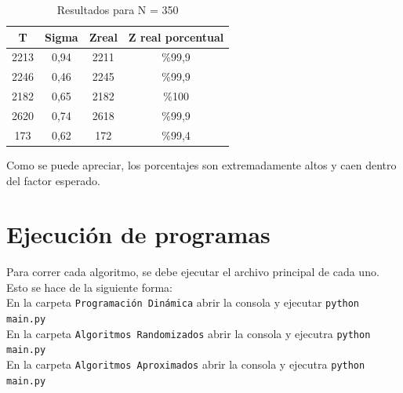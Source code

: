 \documentclass[a4paper, 10pt]{article}
\def\code#1{\texttt{#1}}
\newcommand\tab[1][0.5cm]{\hspace*{#1}}
\begin{document}
                \begin{table}[h!]
                    \centering
                    \caption{Resultados para N = 350}


                    \begin{tabular}{c|c|c|c}
                        T & Sigma & Zreal & Z real porcentual \\
                        \hline
                        2213 & 0,94 & 2211 & \%99,9 \\
                        \hline
                        2246 & 0,46 & 2245 & \%99,9 \\
                        \hline
                        2182 & 0,65 & 2182 & \%100 \\
                        \hline
                        2620 & 0,74 & 2618 & \%99,9 \\
                        \hline
                        173 & 0,62 & 172 & \%99,4 \\
                    \end{tabular}
                \end{table}

                \tab Como se puede apreciar, los porcentajes son extremadamente altos y caen dentro del factor esperado.
    \newpage

    \section{Ejecución de programas}
    \tab Para correr cada algoritmo, se debe ejecutar el archivo principal de cada uno.
    Esto se hace de la siguiente forma: \\
    \tab\tab En la carpeta \code{Programación Dinámica} abrir la consola y ejecutar \code{python main.py} \\
    \tab\tab En la carpeta \code{Algoritmos Randomizados} abrir la consola y ejecutra \code{python main.py} \\
    \tab\tab En la carpeta \code{Algoritmos Aproximados} abrir la consola y ejecutra \code{python main.py} \\

\end{document}
